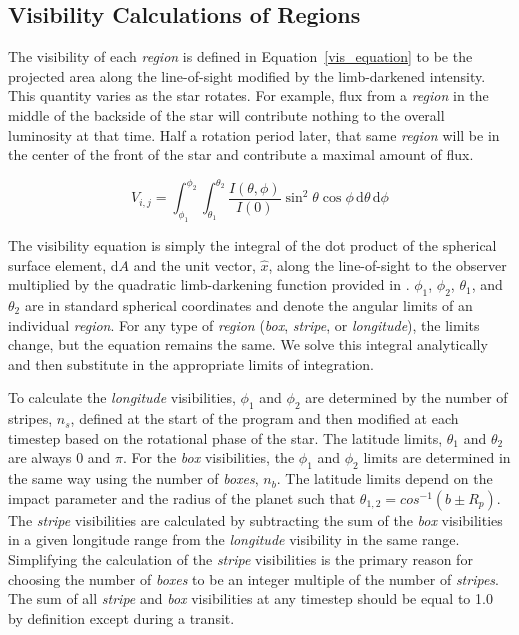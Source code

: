 

\subsection{Visibility Calculations of Regions \label{vis}}
The visibility of each {\it region} is defined in Equation~\ref{vis_equation} to be the projected area along the line-of-sight modified by the limb-darkened intensity. This quantity varies as the star rotates. For example, flux from a {\it region} in the middle of the backside of the star will contribute nothing to the overall luminosity at that time. Half a rotation period later, that same {\it region} will be in the center of the front of the star and contribute a maximal amount of flux.

\begin{equation}
	V_{i,j} = \int_{\phi_1}^{\phi_2} \int_{\theta_1}^{\theta_2} \frac{I(\theta, \phi)}{I(0)} \sin^2{\theta}\cos{\phi}\,\mathrm{d}\theta \, \mathrm{d}\phi
	\label{vis_equation}
\end{equation}

The visibility equation is simply the integral of the dot product of the spherical surface element, d$A$ and the unit vector, $\hat{x}$, along the line-of-sight to the observer multiplied by the quadratic limb-darkening function provided in \citet{Claret2004}. $\phi_1$, $\phi_2$, $\theta_1$, and $\theta_2$ are in standard spherical coordinates and denote the angular limits of an individual {\it region}. For any type of {\it region} ({\it box}, {\it stripe}, or {\it longitude}), the limits change, but the equation remains the same. We solve this integral analytically and then substitute in the appropriate limits of integration.

To calculate the {\it longitude} visibilities, $\phi_1$ and $\phi_2$ are determined by the number of stripes, $n_s$, defined at the start of the program and then modified at each timestep based on the rotational phase of the star. The latitude limits, $\theta_1$ and $\theta_2$ are always 0 and $\pi$. For the {\it box} visibilities, the $\phi_1$ and $\phi_2$ limits are determined in the same way using the number of {\it boxes}, $n_b$. The latitude limits depend on the impact parameter and the radius of the planet such that $\theta_{1,2} = cos^{-1}(b \pm R_p)$. The {\it stripe} visibilities are calculated by subtracting the sum of the {\it box} visibilities in a given longitude range from the {\it longitude} visibility in the same range. Simplifying the calculation of the {\it stripe} visibilities is the primary reason for choosing the number of {\it boxes} to be an integer multiple of the number of {\it stripes}. The sum of all {\it stripe} and {\it box} visibilities at any timestep should be equal to 1.0 by definition except during a transit. 

